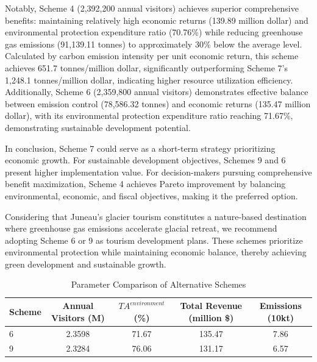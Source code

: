 \documentclass{mcmthesis}
\begin{document}
Notably, Scheme 4 (2,392,200 annual visitors) achieves superior comprehensive benefits: maintaining relatively high economic returns (139.89 million dollar) and environmental protection expenditure ratio (70.76\%) while reducing greenhouse gas emissions (91,139.11 tonnes) to approximately 30\% below the average level. Calculated by carbon emission intensity per unit economic return, this scheme achieves 651.7 tonnes/million dollar, significantly outperforming Scheme 7's 1,248.1 tonnes/million dollar, indicating higher resource utilization efficiency. Additionally, Scheme 6 (2,359,800 annual visitors) demonstrates effective balance between emission control (78,586.32 tonnes) and economic returns (135.47 million dollar), with its environmental protection expenditure ratio reaching 71.67\%, demonstrating sustainable development potential.

In conclusion, Scheme 7 could serve as a short-term strategy prioritizing economic growth. For sustainable development objectives, Schemes 9 and 6 present higher implementation value. For decision-makers pursuing comprehensive benefit maximization, Scheme 4 achieves Pareto improvement by balancing environmental, economic, and fiscal objectives, making it the preferred option.

Considering that Juneau's glacier tourism constitutes a nature-based destination where greenhouse gas emissions accelerate glacial retreat, we recommend adopting Scheme 6 or 9 as tourism development plans. These schemes prioritize environmental protection while maintaining economic balance, thereby achieving green development and sustainable growth.

\begin{table}[htbp]
\centering
\caption{Parameter Comparison of Alternative Schemes}
\label{tab:params}
\begin{tabular}{@{}lcccc@{}}
\toprule
Scheme & Annual Visitors (M) & $TA^{environment}$ (\%) & Total Revenue (million \$) & Emissions (10kt) \\
\midrule
6 & 2.3598 & 71.67 & 135.47 & 7.86 \\
9 & 2.3284 & 76.06 & 131.17 & 6.57 \\
\bottomrule
\end{tabular}
\end{table}
\end{document}
